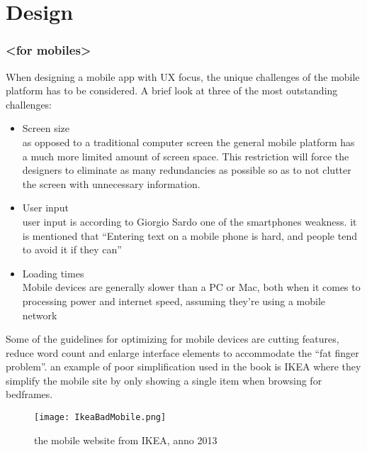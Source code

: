 \chapter{Design}
\subsection{<for mobiles>}
When designing a mobile app with UX focus, the unique challenges of the mobile platform has to be considered. A brief look at three of the most outstanding challenges:
\begin{itemize}
\item Screen size\\
as opposed to a traditional computer screen the general mobile platform has a much more limited amount of screen space. This restriction will force the designers to eliminate as many redundancies as possible so as to not clutter the screen with unnecessary information. \cite{Sardo}
\item User input\\
user input is according to Giorgio Sardo one of  the smartphones weakness. it is mentioned that “Entering text on a mobile phone is hard, and people tend to avoid it if they can”\cite{Sardo}
\item Loading times\\
Mobile devices are generally slower than a PC or Mac, both when it comes to processing power and internet speed, assuming they’re using a mobile network \cite{MobileUsability}
\end{itemize}

Some of the guidelines for optimizing for mobile devices are cutting features, reduce word count and enlarge interface elements to accommodate the “fat finger problem”.\cite{MobileUsability} an example of poor simplification used in the book is IKEA where they simplify the mobile site by only showing a single item when browsing for bedframes.

\begin{figure}[H]
\centering
\texttt{[image: IkeaBadMobile.png]}
\caption{the mobile website from IKEA, anno 2013}
\end{figure}

